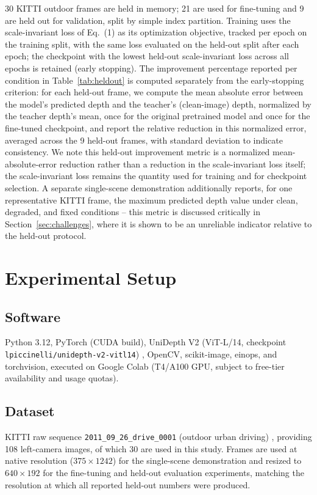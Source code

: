 \documentclass[conference]{IEEEtran}
\begin{document}
30 KITTI outdoor frames are held in memory; 21 are used for fine-tuning and 9 are held out for validation, split by simple index partition. Training uses the scale-invariant loss of Eq.~(1) as its optimization objective, tracked per epoch on the training split, with the same loss evaluated on the held-out split after each epoch; the checkpoint with the lowest held-out scale-invariant loss across all epochs is retained (early stopping). The improvement percentage reported per condition in Table~\ref{tab:heldout} is computed separately from the early-stopping criterion: for each held-out frame, we compute the mean absolute error between the model's predicted depth and the teacher's (clean-image) depth, normalized by the teacher depth's mean, once for the original pretrained model and once for the fine-tuned checkpoint, and report the relative reduction in this normalized error, averaged across the 9 held-out frames, with standard deviation to indicate consistency. We note this held-out improvement metric is a normalized mean-absolute-error reduction rather than a reduction in the scale-invariant loss itself; the scale-invariant loss remains the quantity used for training and for checkpoint selection. A separate single-scene demonstration additionally reports, for one representative KITTI frame, the maximum predicted depth value under clean, degraded, and fixed conditions -- this metric is discussed critically in Section~\ref{sec:challenges}, where it is shown to be an unreliable indicator relative to the held-out protocol.

\section{Experimental Setup}

\subsection{Software}

Python 3.12, PyTorch (CUDA build), UniDepth V2 (ViT-L/14, checkpoint \texttt{lpiccinelli/unidepth-v2-vitl14}) \cite{ref1,ref8}, OpenCV, scikit-image, einops, and torchvision, executed on Google Colab (T4/A100 GPU, subject to free-tier availability and usage quotas).

\subsection{Dataset}

KITTI raw sequence \texttt{2011\_09\_26\_drive\_0001} (outdoor urban driving) \cite{ref26}, providing 108 left-camera images, of which 30 are used in this study. Frames are used at native resolution ($375\times1242$) for the single-scene demonstration and resized to $640\times192$ for the fine-tuning and held-out evaluation experiments, matching the resolution at which all reported held-out numbers were produced.
\end{document}
